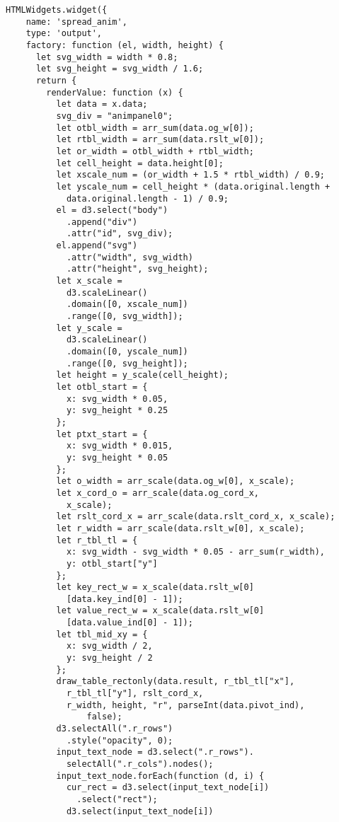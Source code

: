 \begin{lstlisting}
HTMLWidgets.widget({
    name: 'spread_anim',
    type: 'output',
    factory: function (el, width, height) {
      let svg_width = width * 0.8;
      let svg_height = svg_width / 1.6;
      return {
        renderValue: function (x) {
          let data = x.data;
          svg_div = "animpanel0";
          let otbl_width = arr_sum(data.og_w[0]);
          let rtbl_width = arr_sum(data.rslt_w[0]);
          let or_width = otbl_width + rtbl_width;
          let cell_height = data.height[0];
          let xscale_num = (or_width + 1.5 * rtbl_width) / 0.9;
          let yscale_num = cell_height * (data.original.length + 
            data.original.length - 1) / 0.9;
          el = d3.select("body")
            .append("div")
            .attr("id", svg_div);
          el.append("svg")
            .attr("width", svg_width)
            .attr("height", svg_height);
          let x_scale =
            d3.scaleLinear()
            .domain([0, xscale_num])
            .range([0, svg_width]);
          let y_scale =
            d3.scaleLinear()
            .domain([0, yscale_num])
            .range([0, svg_height]);
          let height = y_scale(cell_height);
          let otbl_start = {
            x: svg_width * 0.05,
            y: svg_height * 0.25
          };
          let ptxt_start = {
            x: svg_width * 0.015,
            y: svg_height * 0.05
          };
          let o_width = arr_scale(data.og_w[0], x_scale);
          let x_cord_o = arr_scale(data.og_cord_x, 
            x_scale);
          let rslt_cord_x = arr_scale(data.rslt_cord_x, x_scale);
          let r_width = arr_scale(data.rslt_w[0], x_scale);
          let r_tbl_tl = {
            x: svg_width - svg_width * 0.05 - arr_sum(r_width),
            y: otbl_start["y"]
          };
          let key_rect_w = x_scale(data.rslt_w[0]
            [data.key_ind[0] - 1]);
          let value_rect_w = x_scale(data.rslt_w[0]
            [data.value_ind[0] - 1]);
          let tbl_mid_xy = {
            x: svg_width / 2,
            y: svg_height / 2
          };
          draw_table_rectonly(data.result, r_tbl_tl["x"], 
            r_tbl_tl["y"], rslt_cord_x,
            r_width, height, "r", parseInt(data.pivot_ind), 
                false);
          d3.selectAll(".r_rows")
            .style("opacity", 0);
          input_text_node = d3.select(".r_rows").
            selectAll(".r_cols").nodes();
          input_text_node.forEach(function (d, i) {
            cur_rect = d3.select(input_text_node[i])
              .select("rect");
            d3.select(input_text_node[i])

\end{lstlisting}
